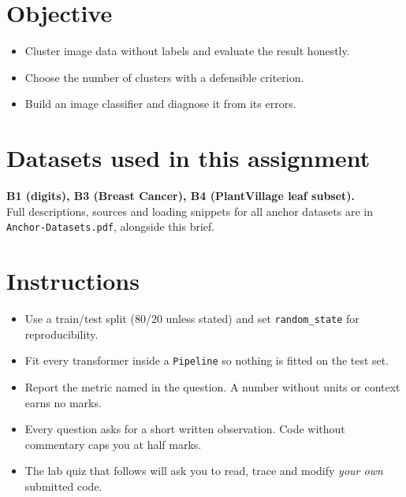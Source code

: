 \documentclass[11pt,a4paper]{article}
\begin{document}

\section*{Objective}

\begin{itemize}[leftmargin=*]

  \item Cluster image data without labels and evaluate the result honestly.

  \item Choose the number of clusters with a defensible criterion.

  \item Build an image classifier and diagnose it from its errors.

\end{itemize}

\section*{Datasets used in this assignment}

\textbf{B1 (digits), B3 (Breast Cancer), B4 (PlantVillage leaf subset).}\\ Full descriptions, sources and loading snippets for all anchor datasets are in \texttt{Anchor-Datasets.pdf}, alongside this brief.

\section*{Instructions}

\begin{itemize}[leftmargin=*]

  \item Use a train/test split (80/20 unless stated) and set \texttt{random\_state} for reproducibility.

  \item Fit every transformer inside a \texttt{Pipeline} so nothing is fitted on the test set.

  \item Report the metric named in the question. A number without units or context earns no marks.

  \item Every question asks for a short written observation. Code without commentary caps you at half marks.

  \item The lab quiz that follows will ask you to read, trace and modify \emph{your own} submitted code.

\end{itemize}
\end{document}
